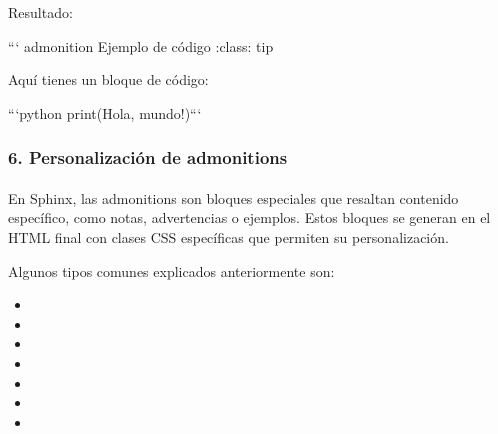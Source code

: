 \documentclass[a4paper,10pt,spanish]{sphinxmanual}
\begin{document}
\begin{sphinxVerbatim}[commandchars=\\\{\}]

Resultado:

``` \PYGZob{}admonition\PYGZcb{} Ejemplo de código
:class: tip

Aquí tienes un bloque de código:

    ```python
    print(\PYGZdq{}Hola, mundo!\PYGZdq{})```
\end{sphinxVerbatim}


\subsubsection{6. Personalización de admonitions}
\label{\detokenize{configuracion_inicial/013.guia_de_myst_parser:personalizacion-de-admonitions}}

\paragraph{}
\label{\detokenize{configuracion_inicial/013.guia_de_myst_parser:entender-la-estructura-de-admonitions-en-sphinx}}
\sphinxAtStartPar
En Sphinx, las admonitions son bloques especiales que resaltan contenido específico, como notas, advertencias o ejemplos. Estos bloques se generan en el HTML final con clases CSS específicas que permiten su personalización.

\sphinxAtStartPar
Algunos tipos comunes explicados anteriormente son:
\begin{itemize}
\item {} 
\sphinxAtStartPar
{}

\item {} 
\sphinxAtStartPar
{}

\item {} 
\sphinxAtStartPar
{}

\item {} 
\sphinxAtStartPar
{}

\item {} 
\sphinxAtStartPar
{}

\item {} 
\sphinxAtStartPar
{}

\item {} 
\sphinxAtStartPar
{}

\end{itemize}
\end{document}
